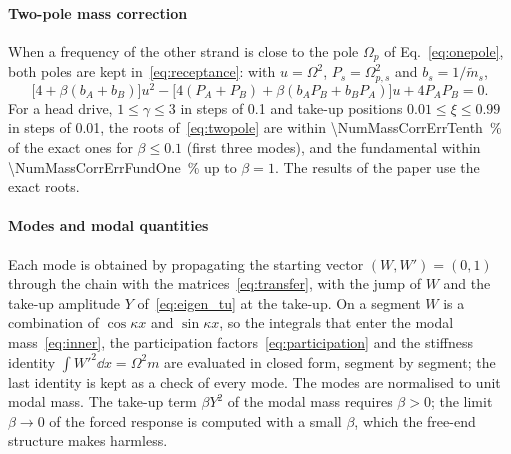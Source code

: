 \paragraph{Two-pole mass correction} When a frequency of the other strand is close to the pole
$\Omega_p$ of Eq.~\eqref{eq:onepole}, both poles are kept in~\eqref{eq:receptance}: with
$u=\Omega^2$, $P_s=\Omega_{p,s}^2$ and $b_s=1/\tilde m_s$,
\begin{equation}\label{eq:twopole}
  \bigl[4+\beta(b_A+b_B)\bigr]u^2-\bigl[4(P_A+P_B)+\beta(b_AP_B+b_BP_A)\bigr]u+4P_AP_B=0 .
\end{equation}
For a head drive, $1\le\gamma\le3$ in steps of 0.1 and take-up positions
$0.01\le\xi\le0.99$ in steps of 0.01, the roots of~\eqref{eq:twopole} are within
\qty{\NumMassCorrErrTenth}{\percent} of the exact ones for $\beta\le0.1$ (first three modes),
and the fundamental within \qty{\NumMassCorrErrFundOne}{\percent} up to $\beta=1$. The results of
the paper use the exact roots.

\paragraph{Modes and modal quantities} Each mode is obtained by propagating the
starting vector $(W,W')=(0,1)$ through the chain with the matrices~\eqref{eq:transfer}, with the jump of
$W$ and the take-up amplitude $Y$ of~\eqref{eq:eigen_tu} at the take-up. On a segment
$W$ is a combination of $\cos\kappa x$ and $\sin\kappa x$, so the integrals that enter
the modal mass~\eqref{eq:inner}, the participation factors~\eqref{eq:participation}
and the stiffness identity $\int W'^2\dd x=\Omega^2m$ are evaluated in closed form,
segment by segment; the last identity is kept as a check of every mode. The modes are
normalised to unit modal mass. The take-up term $\beta Y^2$ of the modal mass requires
$\beta>0$; the limit $\beta\to0$ of the forced response is computed with a small
$\beta$, which the free-end structure makes harmless.

